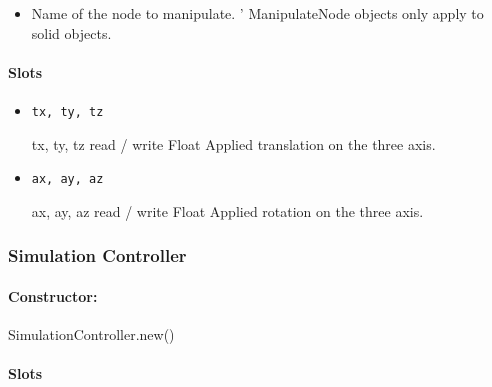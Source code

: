 \begin{itemize}
\item {} Name of the \webots node to
  manipulate. \webots' ManipulateNode objects only apply to solid
  objects.
\end{itemize}

\paragraph{Slots}

\begin{itemize}
\item \lstinline{tx, ty, tz}
\begin{attribute}{tx, ty, tz}
  {read / write}
  {Float}
  {}
  Applied translation on the three axis.
\end{attribute}
\item \lstinline{ax, ay, az}
\begin{attribute}{ax, ay, az}
  {read / write}
  {Float}
  {}
  Applied rotation on the three axis.
\end{attribute}
\end{itemize}

\subsubsection{Simulation Controller}

\paragraph{Constructor:} SimulationController.new()

\paragraph{Slots}

